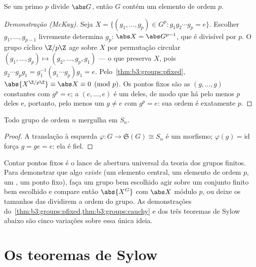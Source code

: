 \begin{theorem}[Cauchy]\label{thm:b3:groups:cauchy}
Se um primo $p$ divide $\abs G$, então $G$ contém um
elemento de ordem $p$.
\end{theorem}

\begin{proof}[Demonstração (McKay)]
Seja $X = \{(g_1, \dots, g_p) \in G^p : g_1 g_2 \cdots g_p = e\}$. Escolher $g_1, \dots, g_{p-1}$ livremente determina $g_p$: $\abs X =
\abs G^{p-1}$, que é
divisível por $p$. O grupo cíclico $\Z/p\Z$ age sobre $X$
por permutação circular $(g_1, \dots, g_p) \mapsto (g_2, \dots, g_p,
g_1)$ --- o que preserva $X$, pois $g_2 \cdots g_p g_1 =
g_1^{-1}(g_1 \cdots g_p)g_1 = e$.
Pelo~\cref{thm:b3:groups:pfixed}, $\abs{X^{\Z/p\Z}} \equiv \abs X \equiv 0 \pmod p$. Os pontos fixos são as $(g, \dots, g)$ constantes com
$g^p = e$; a $(e,
\dots, e)$ é um deles, de modo que há pelo menos $p$ deles e,
portanto, pelo menos um $g \neq e$ com $g^p = e$: sua ordem é exatamente
$p$.
\end{proof}

\begin{theorem}[Cayley]\label{thm:b3:groups:cayley}
Todo grupo de ordem $n$ mergulha em $S_n$.
\end{theorem}

\begin{proof}
A translação à esquerda $\varphi \colon G \to \mathfrak S(G) \cong S_n$ é um morfismo; $\varphi(g) = \mathrm{id}$ força $g = ge = e$: ela é
fiel.
\end{proof}

\begin{method}\label{met:b3:groups:counting}
Contar pontos fixos é o lance de abertura universal da teoria dos
grupos finitos. Para demonstrar que algo \emph{existe} (um elemento
central, um elemento de ordem $p$, um , um ponto
fixo), faça um grupo bem escolhido agir sobre um conjunto finito bem
escolhido e compare então $\abs{X^G}$ com $\abs X$ módulo $p$, ou
deixe os tamanhos das  dividirem a ordem do grupo. As
demonstrações do~\cref{thm:b3:groups:pfixed,thm:b3:groups:cauchy} e dos três teoremas de Sylow abaixo são
cinco variações sobre essa única ideia.
\end{method}

\section{Os teoremas de Sylow}


